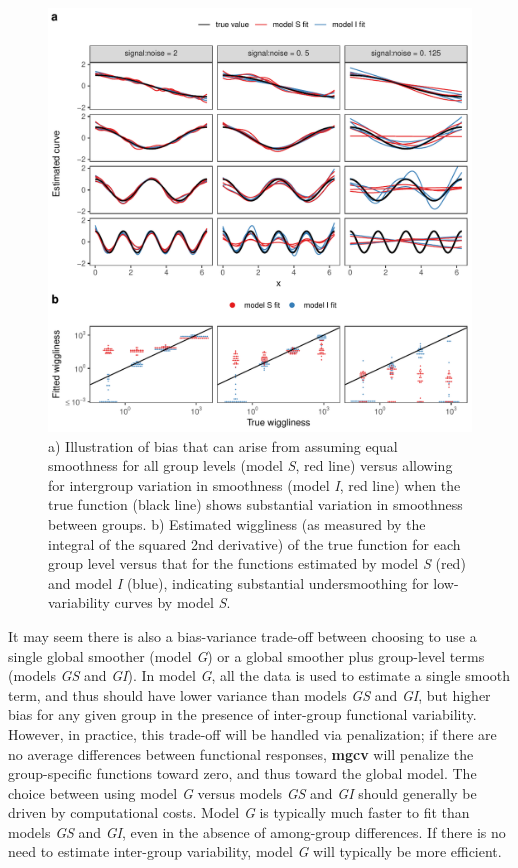 \documentclass[12pt]{article}
\begin{document}
\begin{figure}
\centering
\includegraphics{../figures/single_smooth_bias_plot-1.pdf}
\caption{\label{fig:var_pen} a) Illustration of bias that can arise from
assuming equal smoothness for all group levels (model \emph{S}, red
line) versus allowing for intergroup variation in smoothness (model
\emph{I}, red line) when the true function (black line) shows
substantial variation in smoothness between groups. b) Estimated
wiggliness (as measured by the integral of the squared 2nd derivative)
of the true function for each group level versus that for the functions
estimated by model \emph{S} (red) and model \emph{I} (blue), indicating
substantial undersmoothing for low-variability curves by model
\emph{S}.}
\end{figure}

It may seem there is also a bias-variance trade-off between choosing to
use a single global smoother (model \emph{G}) or a global smoother plus
group-level terms (models \emph{GS} and \emph{GI}). In model \emph{G},
all the data is used to estimate a single smooth term, and thus should
have lower variance than models \emph{GS} and \emph{GI}, but higher bias
for any given group in the presence of inter-group functional
variability. However, in practice, this trade-off will be handled via
penalization; if there are no average differences between functional
responses, \textbf{mgcv} will penalize the group-specific functions
toward zero, and thus toward the global model. The choice between using
model \emph{G} versus models \emph{GS} and \emph{GI} should generally be
driven by computational costs. Model \emph{G} is typically much faster
to fit than models \emph{GS} and \emph{GI}, even in the absence of
among-group differences. If there is no need to estimate inter-group
variability, model \emph{G} will typically be more efficient.
\end{document}
